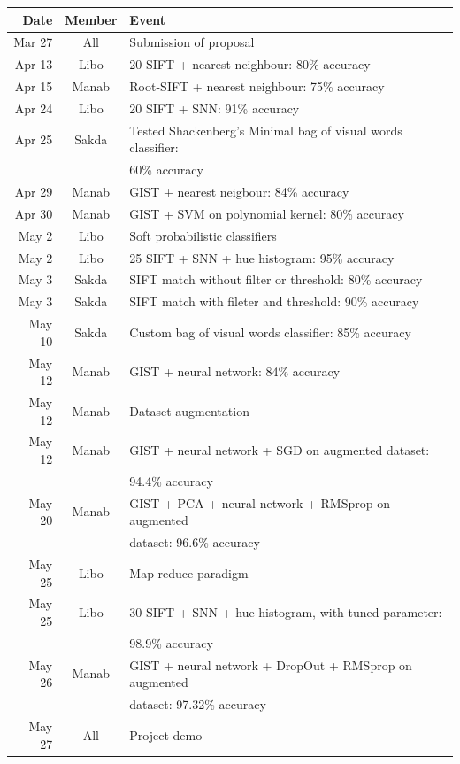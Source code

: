 \documentclass[11pt,a4paper]{article}
\begin{document}
\begin{table}[htbp]
\centering
\begin{tabular}{r|c|l}
Date & Member & Event\\
\hline
Mar 27 & All & Submission of proposal\\
Apr 13 & Libo & 20 SIFT + nearest neighbour: 80\% accuracy\\
Apr 15 & Manab & Root-SIFT + nearest neighbour: 75\% accuracy\\
Apr 24 & Libo & 20 SIFT + SNN: 91\% accuracy\\
Apr 25 & Sakda & Tested Shackenberg's Minimal bag of visual words classifier:\\
 & & 60\% accuracy\\
Apr 29 & Manab & GIST + nearest neigbour: 84\% accuracy\\
Apr 30 & Manab & GIST + SVM on polynomial kernel: 80\% accuracy\\
May 2 & Libo & Soft probabilistic classifiers\\
May 2 & Libo & 25 SIFT + SNN + hue histogram: 95\% accuracy\\
May 3 & Sakda & SIFT match without filter or threshold: 80\% accuracy\\
May 3 & Sakda & SIFT match with fileter and threshold: 90\% accuracy\\
May 10 & Sakda & Custom bag of visual words classifier: 85\% accuracy\\
May 12 & Manab & GIST + neural network: 84\% accuracy\\
May 12 & Manab & Dataset augmentation\\
May 12 & Manab & GIST + neural network + SGD on augmented dataset:\\
 & & 94.4\% accuracy\\
May 20 & Manab & GIST + PCA + neural network + RMSprop on augmented\\
 & & dataset: 96.6\% accuracy\\
May 25 & Libo & Map-reduce paradigm\\
May 25 & Libo & 30 SIFT + SNN + hue histogram, with tuned parameter:\\
 & & 98.9\% accuracy\\
May 26 & Manab & GIST + neural network + DropOut + RMSprop on augmented\\
 & & dataset: 97.32\% accuracy\\
May 27 & All & Project demo\\
\end{tabular}
\end{table}
\end{document}
